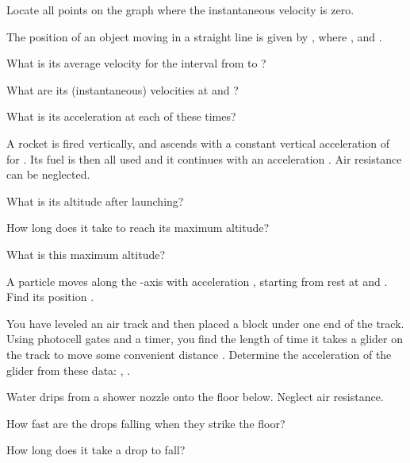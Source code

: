{\begin{two-digit-list}
\begin{one-digit-list}
\item [b.] Locate all points on the graph where the instantaneous velocity is
zero.
\end{one-digit-list}

\item [3.] The position of an object moving in a straight line is given by
, where ,  and .
\begin{one-digit-list}
\item [a.] What is its average velocity for the interval from  to
?
\item [b.] What are its (instantaneous) velocities at  and ?
\item [c.] What is its acceleration at each of these times?
\end{one-digit-list}

\item [4.] A rocket is fired vertically, and ascends with a constant vertical
acceleration of  for .
Its fuel is then all used and it continues with an acceleration
.
Air resistance can be neglected.
\begin{one-digit-list}
\item [a.] What is its altitude  after launching?
\item [b.] How long does it take to reach its maximum altitude?
\item [c.] What is this maximum altitude?
\end{one-digit-list}

\item [5.] A particle moves along the -axis with acceleration
, starting from rest at  and .
Find its position .

\item [6.] You have leveled an air track and then placed a block under one end
of the track.
Using photocell gates and a timer, you find the length of time  it takes a
glider on the track to move some convenient distance .
Determine the acceleration  of the glider from these data:
, .

\item [7.] Water drips from a shower nozzle onto the floor  below.
Neglect air resistance.
\begin{one-digit-list}
\item [a.] How fast are the drops falling when they strike the floor?
\item [b.] How long does it take a drop to fall?
\end{one-digit-list}


\end{two-digit-list}}
